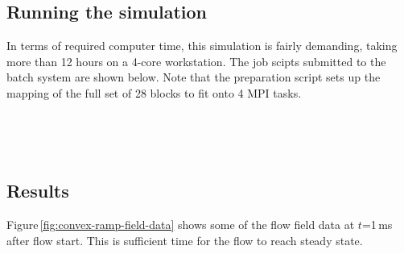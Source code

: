 \noindent
\topbar

\bottombar


\bigskip
\subsection{Running the simulation}
%
In terms of required computer time, this simulation is fairly demanding,
taking more than 12 hours on a 4-core workstation.
The job scipts submitted to the batch system are shown below.
Note that the preparation script sets up the mapping of the full set of 28 blocks to fit onto 4 MPI tasks.

\noindent
\topbar
{}
\bottombar\\
\topbar

\bottombar\\

\subsection{Results}
%
Figure\,\ref{fig:convex-ramp-field-data} shows some of the flow field data 
at $t$=1\,ms after flow start.
This is sufficient time for the flow to reach steady state.

